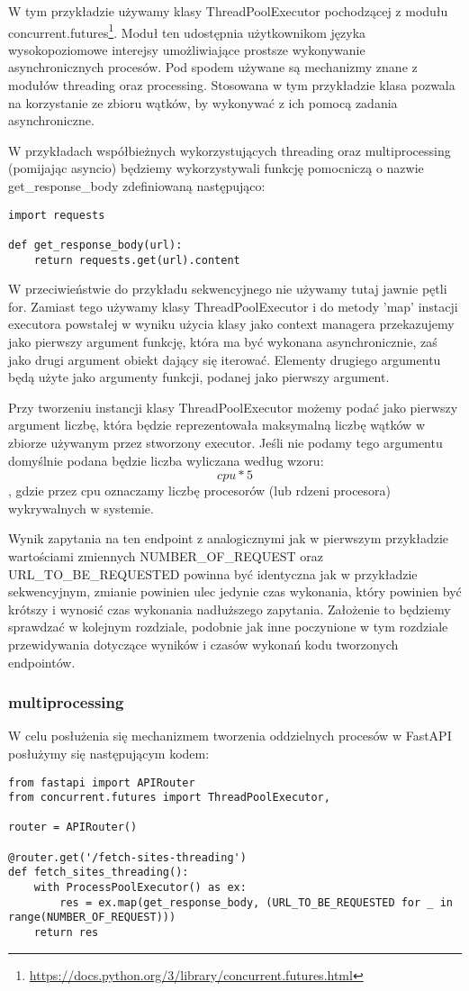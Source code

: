 W tym przykładzie używamy klasy ThreadPoolExecutor pochodzącej z modułu concurrent.futures\footnote{\url{https://docs.python.org/3/library/concurrent.futures.html}}. Moduł ten udostępnia użytkownikom języka wysokopoziomowe interejsy umożliwiające prostsze wykonywanie asynchronicznych procesów. Pod spodem używane są mechanizmy znane z modułów threading oraz processing. Stosowana w tym przykładzie klasa pozwala na korzystanie ze zbioru wątków, by wykonywać z ich pomocą zadania asynchroniczne.

W przykładach współbieżnych wykorzystujących threading oraz multiprocessing (pomijając asyncio) będziemy wykorzystywali funkcję pomocniczą o nazwie get\_response\_body zdefiniowaną następująco:
\begin{lstlisting}
import requests

def get_response_body(url):
    return requests.get(url).content
\end{lstlisting}

W przeciwieństwie do przykładu sekwencyjnego nie używamy tutaj jawnie pętli for. Zamiast tego używamy klasy ThreadPoolExecutor i do metody 'map' instacji executora powstałej w wyniku użycia klasy jako context managera przekazujemy jako pierwszy argument funkcję, która ma być wykonana asynchronicznie, zaś jako drugi argument obiekt dający się iterować. Elementy drugiego argumentu będą użyte jako argumenty funkcji, podanej jako pierwszy argument.

Przy tworzeniu instancji klasy ThreadPoolExecutor możemy podać jako pierwszy argument liczbę, która będzie reprezentowała maksymalną liczbę wątków w zbiorze używanym przez stworzony executor. Jeśli nie podamy tego argumentu domyślnie podana będzie liczba wyliczana według wzoru: 
\[ cpu * 5 \]
, gdzie przez cpu oznaczamy liczbę procesorów (lub rdzeni procesora) wykrywalnych w systemie.

Wynik zapytania na ten endpoint z analogicznymi jak w pierwszym przykładzie wartościami zmiennych NUMBER\_OF\_REQUEST oraz URL\_TO\_BE\_REQUESTED powinna być identyczna jak w przykładzie sekwencyjnym, zmianie powinien ulec jedynie czas wykonania, który powinien być krótszy i wynosić czas wykonania nadłuższego zapytania. Założenie to będziemy sprawdzać w kolejnym rozdziale, podobnie jak inne poczynione w tym rozdziale przewidywania dotyczące wyników i czasów wykonań kodu tworzonych endpointów.

\subsubsection{multiprocessing}
W celu posłużenia się mechanizmem tworzenia oddzielnych procesów w FastAPI posłużymy się następującym kodem:
\begin{lstlisting}
from fastapi import APIRouter
from concurrent.futures import ThreadPoolExecutor,

router = APIRouter()

@router.get('/fetch-sites-threading')
def fetch_sites_threading():
    with ProcessPoolExecutor() as ex:
        res = ex.map(get_response_body, (URL_TO_BE_REQUESTED for _ in range(NUMBER_OF_REQUEST)))
    return res
\end{lstlisting}


